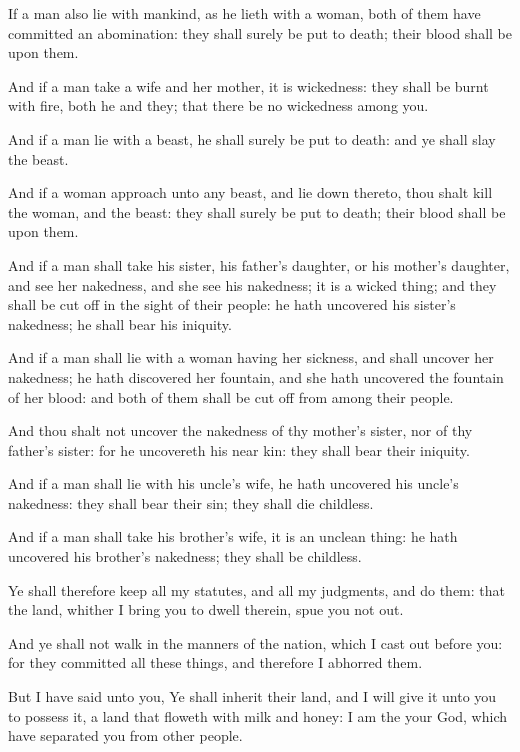 \Verse If a man also lie with mankind, as he lieth with a woman, both of them have committed an abomination: they shall surely be put to death; their blood shall be upon them.

\Verse And if a man take a wife and her mother, it is wickedness: they shall be burnt with fire, both he and they; that there be no wickedness among you.

\Verse And if a man lie with a beast, he shall surely be put to death: and ye shall slay the beast.

\Verse And if a woman approach unto any beast, and lie down thereto, thou shalt kill the woman, and the beast: they shall surely be put to death; their blood shall be upon them.

\Verse And if a man shall take his sister, his father's daughter, or his mother's daughter, and see her nakedness, and she see his nakedness; it is a wicked thing; and they shall be cut off in the sight of their people: he hath uncovered his sister's nakedness; he shall bear his iniquity.

\Verse And if a man shall lie with a woman having her sickness, and shall uncover her nakedness; he hath discovered her fountain, and she hath uncovered the fountain of her blood: and both of them shall be cut off from among their people.

\Verse And thou shalt not uncover the nakedness of thy mother's sister, nor of thy father's sister: for he uncovereth his near kin: they shall bear their iniquity.

\Verse And if a man shall lie with his uncle's wife, he hath uncovered his uncle's nakedness: they shall bear their sin; they shall die childless.

\Verse And if a man shall take his brother's wife, it is an unclean thing: he hath uncovered his brother's nakedness; they shall be childless.

\Verse Ye shall therefore keep all my statutes, and all my judgments, and do them: that the land, whither I bring you to dwell therein, spue you not out.

\Verse And ye shall not walk in the manners of the nation, which I cast out before you: for they committed all these things, and therefore I abhorred them.

\Verse But I have said unto you, Ye shall inherit their land, and I will give it unto you to possess it, a land that floweth with milk and honey: I am the \LORD your God, which have separated you from other people.

